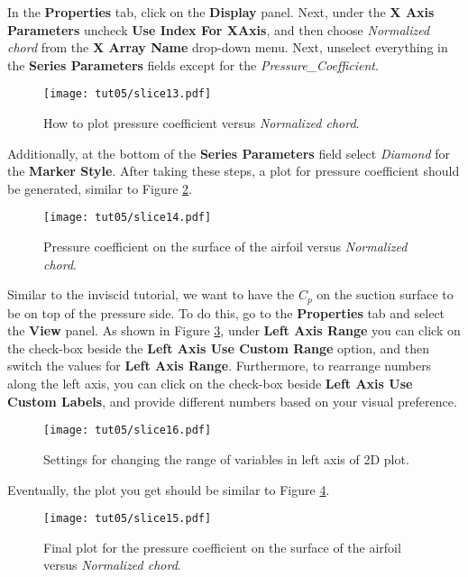 In the \textbf{Properties} tab, click on the \textbf{Display} panel. Next, under the \textbf{X Axis Parameters} uncheck \textbf{Use Index For XAxis}, and then choose \textit{Normalized chord} from the \textbf{X Array Name} drop-down menu. Next, unselect everything in the \textbf{Series Parameters} fields except for the \textit{Pressure\_Coefficient}. 
\begin{figure}[htbp]
    \centering
    \texttt{[image: tut05/slice13.pdf]}
    \caption{How to plot pressure coefficient versus \textit{Normalized chord}.}
    \label{fig5:slice13}
\end{figure}
Additionally, at the bottom of the \textbf{Series Parameters} field select \textit{Diamond} for the \textbf{Marker Style}. After taking these steps, a plot for pressure coefficient should be generated, similar to Figure \ref{fig5:slice14}.
\begin{figure}[htbp]
    \centering
    \texttt{[image: tut05/slice14.pdf]}
    \caption{Pressure coefficient on the surface of the airfoil versus \textit{Normalized chord}.}
    \label{fig5:slice14}
\end{figure}
Similar to the inviscid tutorial, we want to have the $C_p$ on the suction surface to be on top of the pressure side. To do this, go to the \textbf{Properties} tab and select the \textbf{View} panel. As shown in Figure \ref{fig5:slice16}, under \textbf{Left Axis Range} you can click on the check-box beside the \textbf{Left Axis Use Custom Range} option, and then switch the values for \textbf{Left Axis Range}. Furthermore, to rearrange numbers along the left axis, you can click on the check-box beside \textbf{Left Axis Use Custom Labels}, and provide different numbers based on your visual preference.
\begin{figure}[htbp]
    \centering
    \texttt{[image: tut05/slice16.pdf]}
    \caption{Settings for changing the range of variables in left axis of 2D plot.}
    \label{fig5:slice16}
\end{figure}
Eventually, the plot you get should be similar to Figure \ref{fig5:slice15}.
\begin{figure}[htbp]
    \centering
    \texttt{[image: tut05/slice15.pdf]}
    \caption{Final plot for the pressure coefficient on the surface of the airfoil versus \textit{Normalized chord}.}
    \label{fig5:slice15}
\end{figure}
\iffalse
